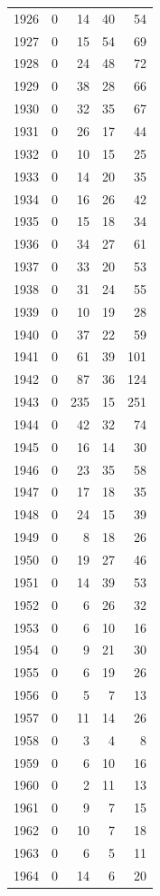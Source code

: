 \documentclass[
  english,
]{article}
\begin{document}
\begin{longtable}{rrrrr}
1926 & 0 & 14 & 40 & 54 \\ 
1927 & 0 & 15 & 54 & 69 \\ 
1928 & 0 & 24 & 48 & 72 \\ 
1929 & 0 & 38 & 28 & 66 \\ 
1930 & 0 & 32 & 35 & 67 \\ 
1931 & 0 & 26 & 17 & 44 \\ 
1932 & 0 & 10 & 15 & 25 \\ 
1933 & 0 & 14 & 20 & 35 \\ 
1934 & 0 & 16 & 26 & 42 \\ 
1935 & 0 & 15 & 18 & 34 \\ 
1936 & 0 & 34 & 27 & 61 \\ 
1937 & 0 & 33 & 20 & 53 \\ 
1938 & 0 & 31 & 24 & 55 \\ 
1939 & 0 & 10 & 19 & 28 \\ 
1940 & 0 & 37 & 22 & 59 \\ 
1941 & 0 & 61 & 39 & 101 \\ 
1942 & 0 & 87 & 36 & 124 \\ 
1943 & 0 & 235 & 15 & 251 \\ 
1944 & 0 & 42 & 32 & 74 \\ 
1945 & 0 & 16 & 14 & 30 \\ 
1946 & 0 & 23 & 35 & 58 \\ 
1947 & 0 & 17 & 18 & 35 \\ 
1948 & 0 & 24 & 15 & 39 \\ 
1949 & 0 & 8 & 18 & 26 \\ 
1950 & 0 & 19 & 27 & 46 \\ 
1951 & 0 & 14 & 39 & 53 \\ 
1952 & 0 & 6 & 26 & 32 \\ 
1953 & 0 & 6 & 10 & 16 \\ 
1954 & 0 & 9 & 21 & 30 \\ 
1955 & 0 & 6 & 19 & 26 \\ 
1956 & 0 & 5 & 7 & 13 \\ 
1957 & 0 & 11 & 14 & 26 \\ 
1958 & 0 & 3 & 4 & 8 \\ 
1959 & 0 & 6 & 10 & 16 \\ 
1960 & 0 & 2 & 11 & 13 \\ 
1961 & 0 & 9 & 7 & 15 \\ 
1962 & 0 & 10 & 7 & 18 \\ 
1963 & 0 & 6 & 5 & 11 \\ 
1964 & 0 & 14 & 6 & 20 \\ 

\end{longtable}
\end{document}
